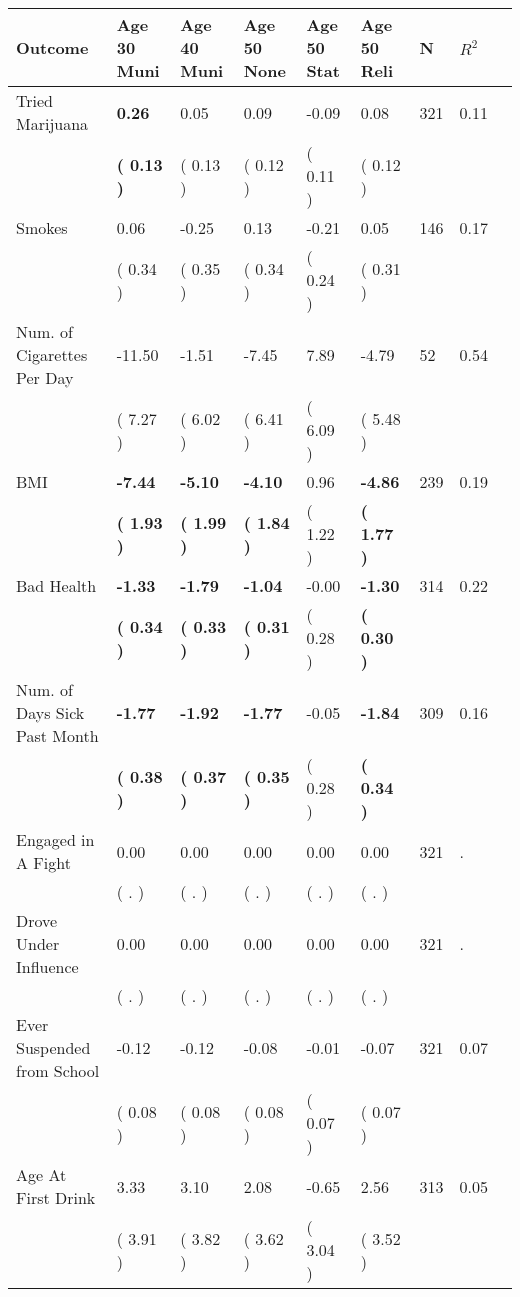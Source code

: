 \begin{tabular}{L{6.2cm} C{1.8cm} C{1.8cm} C{1.8cm} C{1.8cm} C{1.8cm} C{1.8cm} C{0.3cm} C{0.3cm}}
\toprule
 \textbf{Outcome} & \textbf{Age 30 Muni} & \textbf{Age 40 Muni} & \textbf{Age 50 None} & \textbf{Age 50 Stat} & \textbf{Age 50 Reli} & \textbf{N} & \textbf{$ R^2$} \\
\midrule
Tried Marijuana & \textbf{     0.26} &      0.05 &      0.09 &     -0.09 &      0.08  & 321 &       0.11 \\ 
 & \textbf{(     0.13 )} & (     0.13 ) & (     0.12 ) & (     0.11 ) & (     0.12 )  & \\
Smokes &      0.06 &     -0.25 &      0.13 &     -0.21 &      0.05  & 146 &       0.17 \\ 
 & (     0.34 ) & (     0.35 ) & (     0.34 ) & (     0.24 ) & (     0.31 )  & \\
Num. of Cigarettes Per Day &    -11.50 &     -1.51 &     -7.45 &      7.89 &     -4.79  & 52 &       0.54 \\ 
 & (     7.27 ) & (     6.02 ) & (     6.41 ) & (     6.09 ) & (     5.48 )  & \\
BMI & \textbf{    -7.44} & \textbf{    -5.10} & \textbf{    -4.10} &      0.96 & \textbf{    -4.86}  & 239 &       0.19 \\ 
 & \textbf{(     1.93 )} & \textbf{(     1.99 )} & \textbf{(     1.84 )} & (     1.22 ) & \textbf{(     1.77 )}  & \\
Bad Health & \textbf{    -1.33} & \textbf{    -1.79} & \textbf{    -1.04} &     -0.00 & \textbf{    -1.30}  & 314 &       0.22 \\ 
 & \textbf{(     0.34 )} & \textbf{(     0.33 )} & \textbf{(     0.31 )} & (     0.28 ) & \textbf{(     0.30 )}  & \\
Num. of Days Sick Past Month & \textbf{    -1.77} & \textbf{    -1.92} & \textbf{    -1.77} &     -0.05 & \textbf{    -1.84}  & 309 &       0.16 \\ 
 & \textbf{(     0.38 )} & \textbf{(     0.37 )} & \textbf{(     0.35 )} & (     0.28 ) & \textbf{(     0.34 )}  & \\
Engaged in A Fight &      0.00 &      0.00 &      0.00 &      0.00 &      0.00  & 321 &          . \\ 
 & (        . ) & (        . ) & (        . ) & (        . ) & (        . )  & \\
Drove Under Influence &      0.00 &      0.00 &      0.00 &      0.00 &      0.00  & 321 &          . \\ 
 & (        . ) & (        . ) & (        . ) & (        . ) & (        . )  & \\
Ever Suspended from School &     -0.12 &     -0.12 &     -0.08 &     -0.01 &     -0.07  & 321 &       0.07 \\ 
 & (     0.08 ) & (     0.08 ) & (     0.08 ) & (     0.07 ) & (     0.07 )  & \\
Age At First Drink &      3.33 &      3.10 &      2.08 &     -0.65 &      2.56  & 313 &       0.05 \\ 
 & (     3.91 ) & (     3.82 ) & (     3.62 ) & (     3.04 ) & (     3.52 )  & \\
\bottomrule
\end{tabular}
